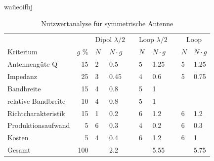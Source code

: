 waüeoifhj
\begin{table}[!ht]
  \centering
  \begin{tabular}{l r l l l l l l l l} \toprule 
  && \multicolumn{2}{c}{Dipol $\lambda/2$}   && \multicolumn{2}{c}{Loop $\lambda/2$}   && \multicolumn{2}{c}{Loop} \\ \cmidrule{3-4} \cmidrule{6-7} \cmidrule{9-10}
  	Kriterium               	& $g$ \%  		& $N$ & $N\cdot g$     	&& $N$ & $N\cdot g$             		&& $N$ 	& $N\cdot g$ \\ \midrule
  	Antennengüte Q          	&  15          	& 2   & 0.5             	&& 5   & 1.25                        && 5   	& 1.25 \\
  	Impedanz               	&  25           	& 3   & 0.45            	&& 4   & 0.6                         && 5   	& 0.75 \\
	Bandbreite 				&	15			& 4   	& 0.8           	&& 5   & 1 							&&		&	\\
	relative Bandbreite 		&	10			& 4   	& 0.8           	&& 5   & 1 							&&		&	\\
  	Richtcharakteristik     &  15            & 1   & 0.2            	&& 6   & 1.2                         && 6   	& 1.2 \\
  	Produktionsaufwand    	&   5           & 6   & 0.3             	&& 4   & 0.2                         && 6   	& 0.3 \\
  	Kosten                  &  5           	& 4   & 0.4             	&& 6   & 1.2                         && 6   	& 1 \\
  \hline
  Gesamt                    & 100          	&     & 2.2             	&&     & 5.55                        &&     	& 5.75 \\ \bottomrule
  \end{tabular}
  \caption{Nutzwertanalyse für symmetrische Antenne}
  \label{nutzwertEvaluation}
\end{table}


